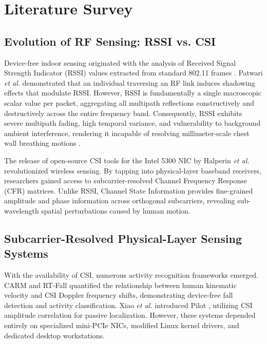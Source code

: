 \chapter{Literature Survey}
\label{chap:literature}

\section{Evolution of RF Sensing: RSSI vs. CSI}
Device-free indoor sensing originated with the analysis of Received Signal Strength Indicator (RSSI) values extracted from standard 802.11 frames \cite{patwari2014breathing, lara2013survey}. Patwari \textit{et al.} demonstrated that an individual traversing an RF link induces shadowing effects that modulate RSSI. However, RSSI is fundamentally a single macroscopic scalar value per packet, aggregating all multipath reflections constructively and destructively across the entire frequency band. Consequently, RSSI exhibits severe multipath fading, high temporal variance, and vulnerability to background ambient interference, rendering it incapable of resolving millimeter-scale chest wall breathing motions \cite{xiao2013pilot, zeng2019farsense}.

The release of open-source CSI tools for the Intel 5300 NIC by Halperin \textit{et al.} \cite{halperin2011tool} revolutionized wireless sensing. By tapping into physical-layer baseband receivers, researchers gained access to subcarrier-resolved Channel Frequency Response (CFR) matrices. Unlike RSSI, Channel State Information provides fine-grained amplitude and phase information across orthogonal subcarriers, revealing sub-wavelength spatial perturbations caused by human motion.

\section{Subcarrier-Resolved Physical-Layer Sensing Systems}
With the availability of CSI, numerous activity recognition frameworks emerged. CARM \cite{wang2015understanding} and RT-Fall \cite{wang2017rt} quantified the relationship between human kinematic velocity and CSI Doppler frequency shifts, demonstrating device-free fall detection and activity classification. Xiao \textit{et al.} introduced Pilot \cite{xiao2013pilot}, utilizing CSI amplitude correlation for passive localization. However, these systems depended entirely on specialized mini-PCIe NICs, modified Linux kernel drivers, and dedicated desktop workstations.

